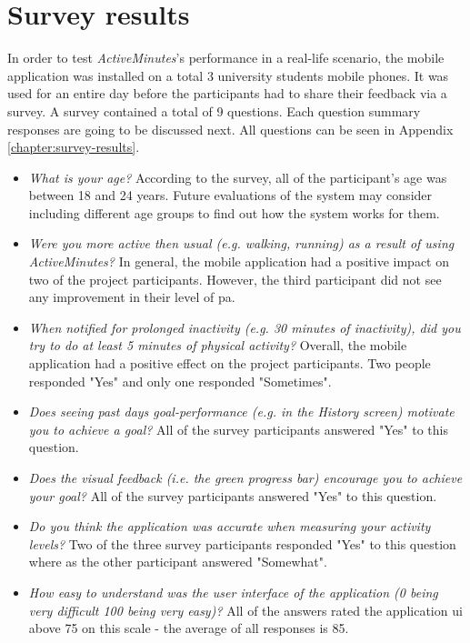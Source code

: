 \section{Survey results}
In order to test \textit{ActiveMinutes}'s performance in a real-life scenario, the mobile application was installed on a total 3 university students mobile phones. It was used for an entire day before the participants had to share their feedback via a survey. A survey contained a total of 9 questions. Each question summary responses are going to be discussed next. All questions can be seen in Appendix \ref{chapter:survey-results}.

\begin{itemize}
    \item \textit{What is your age?}
    According to the survey, all of the participant's age was between 18 and 24 years. Future evaluations of the system may consider including different age groups to find out how the system works for them.
    \item \textit{Were you more active then usual (e.g. walking, running) as a result of using ActiveMinutes?}
    In general, the mobile application had a positive impact on two of the project participants. However, the third participant did not see any improvement in their level of \gls{pa}. 
    \item \textit{When notified for prolonged inactivity (e.g. 30 minutes of inactivity), did you try to do at least 5 minutes of physical activity?}
    Overall, the mobile application had a positive effect on the project participants. Two people responded "Yes" and only one responded "Sometimes". 
    \item \textit{Does seeing past days goal-performance (e.g. in the History screen) motivate you to achieve a goal?}
    All of the survey participants answered "Yes" to this question.
    \item \textit{Does the visual feedback (i.e. the green progress bar) encourage you to achieve your goal?}
    All of the survey participants answered "Yes" to this question.
    \item \textit{Do you think the application was accurate when measuring your activity levels?}
    Two of the three survey participants responded "Yes" to this question where as the other participant answered "Somewhat".
    \item \textit{How easy to understand was the user interface of the application (0 being very difficult 100 being very easy)?} All of the answers rated the application \gls{ui} above 75 on this scale - the average of all responses is 85.

\end{itemize}
